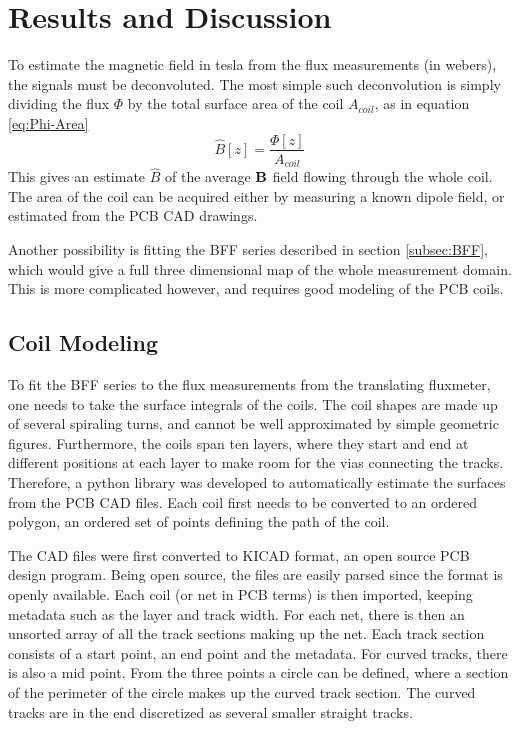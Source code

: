 \chapter{Results and Discussion}
To estimate the magnetic field in tesla from the flux measurements
(in webers), the signals must be deconvoluted. The most simple
such deconvolution is simply dividing the flux $\Phi$ by the total surface
area of the coil $A_{coil}$, as in equation \ref{eq:Phi-Area}
\begin{equation}
    \hat{B}[z] = \frac{\Phi[z]}{A_{coil}}
    \label{eq:Phi-Area}
\end{equation}
This gives an estimate $\hat{B}$ of the average $\vb{B}$ field
flowing through the whole coil. The area of the coil can be acquired
either by measuring a known dipole field, or estimated from the
PCB CAD drawings.

Another possibility is fitting the BFF series described in section
\ref{subsec:BFF}, which would give a full three dimensional map of
the whole measurement domain. This is more complicated however,
and requires good modeling of the PCB coils.

\section{Coil Modeling}
\label{sec:coil-modeling}
To fit the BFF series to the flux measurements from the translating
fluxmeter, one needs to take the surface integrals of the coils.
The coil shapes are made up of several spiraling turns, and cannot be
well approximated by simple geometric figures.
Furthermore, the coils span ten layers,
where they start and end at different positions at each layer to make
room for the vias connecting the tracks. Therefore, a python library
was developed to automatically estimate the surfaces from the
PCB CAD files. Each coil first needs to be converted to an
ordered polygon, an ordered set of points defining the path
of the coil.

The CAD files were first converted to KICAD format, an open source
PCB design program. Being open source, the files are easily parsed
since the format is openly available. \cite{noauthor_board_nodate}
Each coil (or net in PCB terms) is then imported, keeping metadata such as
the layer and track width. For each net, there is then an unsorted
array of all the track sections making up the net. Each track
section consists of a start point, an end point and the metadata.
For curved tracks, there is also a mid point. From the three points
a circle can be defined, where a section of the perimeter of the
circle makes up the curved track section. The curved tracks are in the
end discretized as several smaller straight tracks.

